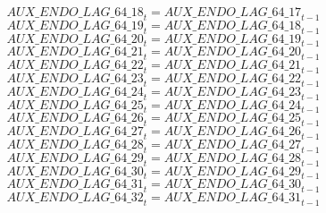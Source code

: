 \begin{dmath}
{AUX\_ENDO\_LAG\_64\_18}_{t}={AUX\_ENDO\_LAG\_64\_17}_{t-1}
\end{dmath}
\begin{dmath}
{AUX\_ENDO\_LAG\_64\_19}_{t}={AUX\_ENDO\_LAG\_64\_18}_{t-1}
\end{dmath}
\begin{dmath}
{AUX\_ENDO\_LAG\_64\_20}_{t}={AUX\_ENDO\_LAG\_64\_19}_{t-1}
\end{dmath}
\begin{dmath}
{AUX\_ENDO\_LAG\_64\_21}_{t}={AUX\_ENDO\_LAG\_64\_20}_{t-1}
\end{dmath}
\begin{dmath}
{AUX\_ENDO\_LAG\_64\_22}_{t}={AUX\_ENDO\_LAG\_64\_21}_{t-1}
\end{dmath}
\begin{dmath}
{AUX\_ENDO\_LAG\_64\_23}_{t}={AUX\_ENDO\_LAG\_64\_22}_{t-1}
\end{dmath}
\begin{dmath}
{AUX\_ENDO\_LAG\_64\_24}_{t}={AUX\_ENDO\_LAG\_64\_23}_{t-1}
\end{dmath}
\begin{dmath}
{AUX\_ENDO\_LAG\_64\_25}_{t}={AUX\_ENDO\_LAG\_64\_24}_{t-1}
\end{dmath}
\begin{dmath}
{AUX\_ENDO\_LAG\_64\_26}_{t}={AUX\_ENDO\_LAG\_64\_25}_{t-1}
\end{dmath}
\begin{dmath}
{AUX\_ENDO\_LAG\_64\_27}_{t}={AUX\_ENDO\_LAG\_64\_26}_{t-1}
\end{dmath}
\begin{dmath}
{AUX\_ENDO\_LAG\_64\_28}_{t}={AUX\_ENDO\_LAG\_64\_27}_{t-1}
\end{dmath}
\begin{dmath}
{AUX\_ENDO\_LAG\_64\_29}_{t}={AUX\_ENDO\_LAG\_64\_28}_{t-1}
\end{dmath}
\begin{dmath}
{AUX\_ENDO\_LAG\_64\_30}_{t}={AUX\_ENDO\_LAG\_64\_29}_{t-1}
\end{dmath}
\begin{dmath}
{AUX\_ENDO\_LAG\_64\_31}_{t}={AUX\_ENDO\_LAG\_64\_30}_{t-1}
\end{dmath}
\begin{dmath}
{AUX\_ENDO\_LAG\_64\_32}_{t}={AUX\_ENDO\_LAG\_64\_31}_{t-1}
\end{dmath}
